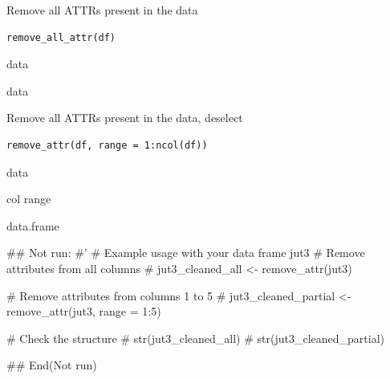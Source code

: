 \documentclass[a4paper]{book}
\begin{document}
%
\begin{Description}
Remove all ATTRs present in the data
\end{Description}
%
\begin{Usage}
\begin{verbatim}
remove_all_attr(df)
\end{verbatim}
\end{Usage}
%
\begin{Arguments}
\begin{ldescription}
\item[\code{df}] data
\end{ldescription}
\end{Arguments}
%
\begin{Value}
data
\end{Value}
%
\begin{Description}
Remove all ATTRs present in the data, deselect
\end{Description}
%
\begin{Usage}
\begin{verbatim}
remove_attr(df, range = 1:ncol(df))
\end{verbatim}
\end{Usage}
%
\begin{Arguments}
\begin{ldescription}
\item[\code{df}] data

\item[\code{range}] col range
\end{ldescription}
\end{Arguments}
%
\begin{Value}
data.frame
\end{Value}
%
\begin{Examples}
\begin{ExampleCode}

## Not run: 
#'
# Example usage with your data frame jut3
# Remove attributes from all columns
# jut3_cleaned_all <- remove_attr(jut3)

# Remove attributes from columns 1 to 5
# jut3_cleaned_partial <- remove_attr(jut3, range = 1:5)

# Check the structure
# str(jut3_cleaned_all)
# str(jut3_cleaned_partial)

## End(Not run)


\end{ExampleCode}
\end{Examples}
\end{document}
